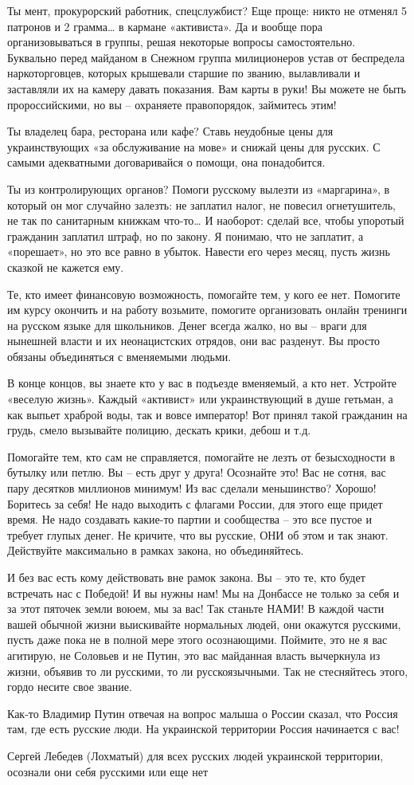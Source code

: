 Ты мент, прокурорский работник, спецслужбист? Еще проще: никто не отменял 5
патронов и 2 грамма… в кармане «активиста». Да и вообще пора организовываться в
группы, решая некоторые вопросы самостоятельно. Буквально перед майданом в
Снежном группа милиционеров устав от беспредела наркоторговцев, которых
крышевали старшие по званию, вылавливали и заставляли их на камеру давать
показания. Вам карты в руки! Вы можете не быть пророссийскими, но вы –
охраняете правопорядок, займитесь этим!

Ты владелец бара, ресторана или кафе? Ставь неудобные цены для украинствующих
«за обслуживание на мове» и снижай цены для русских. С самыми адекватными
договаривайся о помощи, она понадобится.

Ты из контролирующих органов? Помоги русскому вылезти из «маргарина», в который
он мог случайно залезть: не заплатил налог, не повесил огнетушитель, не так по
санитарным книжкам что-то… И наоборот: сделай все, чтобы упоротый гражданин
заплатил штраф, но по закону. Я понимаю, что не заплатит, а «порешает», но это
все равно в убыток. Навести его через месяц, пусть жизнь сказкой не кажется
ему.

Те, кто имеет финансовую возможность, помогайте тем, у кого ее нет. Помогите им
курсу окончить и на работу возьмите, помогите организовать онлайн тренинги на
русском языке для школьников. Денег всегда жалко, но вы – враги для нынешней
власти и их неонацистских отрядов, они вас разденут. Вы просто обязаны
объединяться с вменяемыми людьми.

В конце концов, вы знаете кто у вас в подъезде вменяемый, а кто нет. Устройте
«веселую жизнь». Каждый «активист» или украинствующий в душе гетьман, а как
выпьет храброй воды, так и вовсе император! Вот принял такой гражданин на
грудь, смело вызывайте полицию, дескать крики, дебош и т.д.

Помогайте тем, кто сам не справляется, помогайте не лезть от безысходности в
бутылку или петлю. Вы – есть друг у друга! Осознайте это! Вас не сотня, вас
пару десятков миллионов минимум! Из вас сделали меньшинство? Хорошо! Боритесь
за себя! Не надо выходить с флагами России, для этого еще придет время. Не надо
создавать какие-то партии и сообщества – это все пустое и требует глупых денег.
Не кричите, что вы русские, ОНИ об этом и так знают. Действуйте максимально в
рамках закона, но объединяйтесь.

И без вас есть кому действовать вне рамок закона. Вы – это те, кто будет
встречать нас с Победой! И вы нужны нам! Мы на Донбассе не только за себя и за
этот пяточек земли воюем, мы за вас! Так станьте НАМИ! В каждой части вашей
обычной жизни выискивайте нормальных людей, они окажутся русскими, пусть даже
пока не в полной мере этого осознающими. Поймите, это не я вас агитирую, не
Соловьев и не Путин, это вас майданная власть вычеркнула из жизни, объявив то
ли русскими, то ли русскоязычными. Так не стесняйтесь этого, гордо несите свое
звание.

Как-то Владимир Путин отвечая на вопрос малыша о России сказал, что Россия там,
где есть русские люди. На украинской территории Россия начинается с вас!

Сергей Лебедев (Лохматый) для всех русских людей украинской территории,
осознали они себя русскими или еще нет
  
